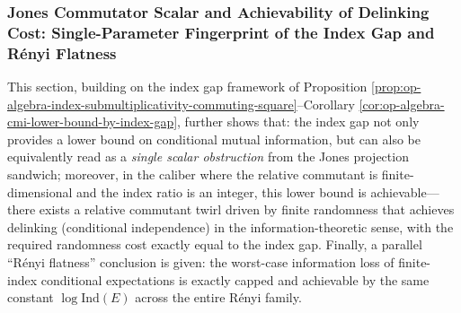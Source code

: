 \subsubsection{Jones Commutator Scalar and Achievability of Delinking Cost: Single-Parameter Fingerprint of the Index Gap and R\'enyi Flatness}\label{subsubsec:op-algebra-jones-scalar-twirl-cost-renyi-flatness}
This section, building on the index gap framework of Proposition \ref{prop:op-algebra-index-submultiplicativity-commuting-square}--Corollary \ref{cor:op-algebra-cmi-lower-bound-by-index-gap}, further shows that:
the index gap not only provides a lower bound on conditional mutual information, but can also be equivalently read as a \emph{single scalar obstruction} from the Jones projection sandwich;
moreover, in the caliber where the relative commutant is finite-dimensional and the index ratio is an integer, this lower bound is achievable---there exists a relative commutant twirl driven by finite randomness that achieves delinking (conditional independence) in the information-theoretic sense, with the required randomness cost exactly equal to the index gap.
Finally, a parallel ``R\'enyi flatness'' conclusion is given: the worst-case information loss of finite-index conditional expectations is exactly capped and achievable by the same constant \(\log\mathrm{Ind}(E)\) across the entire R\'enyi family.

